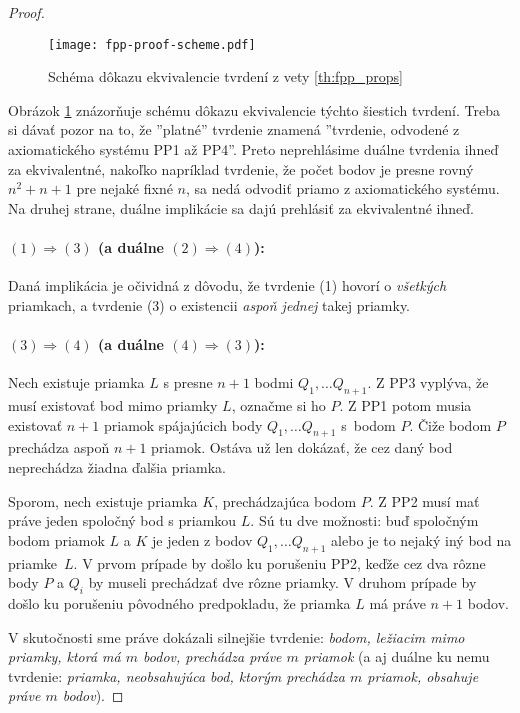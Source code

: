\begin{proof}
\begin{figure}
    \centering
    \texttt{[image: fpp-proof-scheme.pdf]}
    \caption{Schéma dôkazu ekvivalencie tvrdení z vety \ref{th:fpp_props}}
    \label{fig:fpp_props_scheme}
\end{figure}
Obrázok \ref{fig:fpp_props_scheme} znázorňuje schému dôkazu ekvivalencie týchto šiestich tvrdení.
Treba si dávať pozor na to, že ''platné'' tvrdenie znamená ''tvrdenie, odvodené z axiomatického systému PP1 až PP4''.
Preto neprehlásime duálne tvrdenia ihneď za ekvivalentné, nakoľko napríklad tvrdenie, že počet bodov je presne rovný $n^2 + n + 1$ pre nejaké fixné $n$, sa nedá odvodiť priamo z axiomatického systému.
Na druhej strane, duálne implikácie sa dajú prehlásiť za ekvivalentné ihneď.

\paragraph{$(1) \Longrightarrow (3)$ (a duálne $(2) \Longrightarrow (4)$):} Daná implikácia je očividná z dôvodu, že tvrdenie (1) hovorí o \emph{všetkých} priamkach, a tvrdenie (3) o existencii \emph{aspoň jednej} takej priamky.

\paragraph{$(3) \Longrightarrow (4)$ (a duálne $(4) \Longrightarrow (3)$):} 
Nech existuje priamka $L$ s presne $n+1$ bodmi $Q_1, \ldots Q_{n+1}$. 
Z PP3 vyplýva, že musí existovať bod mimo priamky $L$, označme si ho $P$. 
Z PP1 potom musia existovať $n+1$ priamok spájajúcich body  $Q_1, \ldots Q_{n+1}$ s~bodom $P$. 
Čiže bodom $P$ prechádza aspoň $n+1$ priamok. 
Ostáva už len dokázať, že cez daný bod neprechádza žiadna ďalšia priamka. 

Sporom, nech existuje priamka $K$, prechádzajúca bodom $P$. 
Z PP2 musí mať práve jeden spoločný bod s priamkou $L$. 
Sú tu dve možnosti: buď spoločným bodom priamok $L$ a $K$ je jeden z bodov $Q_1, \ldots Q_{n+1}$ alebo je to nejaký iný bod na priamke~$L$. 
V prvom prípade by došlo ku porušeniu PP2, keďže cez dva rôzne body $P$ a $Q_i$ by museli prechádzať dve rôzne priamky. 
V druhom prípade by došlo ku porušeniu pôvodného predpokladu, že priamka $L$ má práve $n+1$ bodov.

V skutočnosti sme práve dokázali silnejšie tvrdenie: \emph{bodom, ležiacim mimo priamky, ktorá má $m$ bodov, prechádza práve $m$ priamok} (a aj duálne ku nemu tvrdenie: \emph{priamka, neobsahujúca bod, ktorým prechádza $m$ priamok, obsahuje práve $m$ bodov}).


\end{proof}
